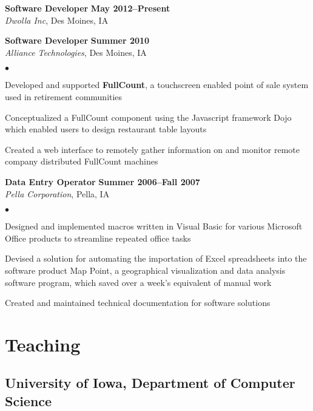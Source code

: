 \documentclass[10pt,letterpaper]{article}
\renewenvironment{itemize}{
  \begin{list}{}{
      \setlength{\leftmargin}{1.5em}
      \setlength{\itemsep}{0.25em}
      \setlength{\parskip}{0pt}
      \setlength{\parsep}{0.25em}
    }
  }{
  \end{list}
}
\newenvironment{bitemize}{
  \begin{list}{$\bullet$}{
      \setlength{\leftmargin}{1.5em}
      \setlength{\itemsep}{0.25em}
      \setlength{\parskip}{0pt}
      \setlength{\parsep}{0.25em}
    }
  }{
  \end{list}
}
\begin{document}
\begin{itemize}
\item \textbf{Software Developer} \hfill \textbf{May 2012--Present}\\
  \textit{Dwolla Inc}, Des Moines, IA

\item \textbf{Software Developer} \hfill \textbf{Summer 2010}\\
  \textit{Alliance Technologies}, Des Moines, IA
  \begin{bitemize}
  \item Developed and supported \textbf{FullCount}, a touchscreen
    enabled point of sale system used in retirement communities
  \item Conceptualized a FullCount component using the Javascript
    framework Dojo which enabled users to design restaurant table
    layouts
  \item Created a web interface to remotely gather information on and
    monitor remote company distributed FullCount machines
  \end{bitemize}

\item \textbf{Data Entry Operator} \hfill \textbf{Summer 2006--Fall 2007}\\
  \textit{Pella Corporation}, Pella, IA
  \begin{bitemize}
  \item Designed and implemented macros written in Visual Basic
    for various Microsoft Office products to streamline repeated
    office tasks %
  \item Devised a solution for automating the importation of Excel
    spreadsheets into the software product Map Point, a geographical
    visualization and data analysis software program, which saved over
    a week's equivalent of manual work
  \item Created and maintained technical documentation for software
    solutions
  \end{bitemize}
\end{itemize}

\section*{Teaching}

\subsection*{University of Iowa, Department of Computer Science}
\end{document}

